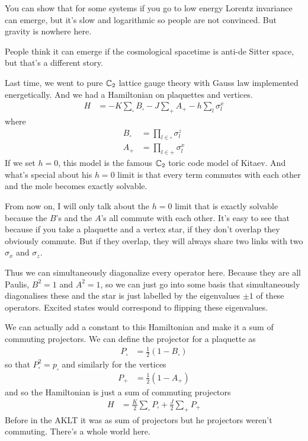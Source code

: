 You can show that for some systems if you go to low energy Lorentz invariance
can emerge,
but it's slow and logarithmic so people are not convinced.
But gravity is nowhere here.

People think it can emerge if the cosmological spacetime is anti-de Sitter
space,
but that's a different story.

Last time,
we went to pure $\mathbb{C}_2$ lattice gauge theory
with Gauss law implemented energetically.
And we had a Hamiltonian on plaquettes and vertices.
\begin{align}
    H &=
    -K \sum_{\square} B_{\square}
    - J \sum_{+} A_{+}
    - h\sum_{l} \sigma_l^{x}
\end{align}
where
\begin{align}
    B_{\square} &=
    \prod_{l \in \square}
    \sigma_l^z\\
    A_{+} &=
    \prod_{l\in +}
    \sigma_l^x
\end{align}
If we set $h=0$,
this model is the famous $\mathbb{C}_2$ toric code model of Kitaev.
And what's special about his $h=0$ limit is that every term commutes with each
other and the mole becomes exactly solvable.

From now on,
I will only talk about the $h=0$ limit that is exactly solvable because
the $B$'s and the $A$'s all commute with each other.
It's easy to see that because if you take a plaquette and a vertex star,
if they don't overlap they obviously commute.
But if they overlap,
they will always share two links with two $\sigma_x$ and $\sigma_z$.

Thus we can simultaneously diagonalize every operator here.
Because they are all Paulis,
$B^2=1$ and $A^2=1$,
so we can just go into  some basis that simultaneously diagonalises these and the
star is just labelled by the eigenvalues $\pm 1$ of these operators.
Excited states would correspond to flipping these eigenvalues.

We can actually add a constant to this Hamiltonian and make it a sum of
commuting projectors.
We can define the projector for a plaquette as
\begin{align}
    P_{\square}
    &=
    \frac{1}{2}\left( 
    1 - B_{\square}
    \right)
\end{align}
so that $P_{\square}^2 = p_{\square}$
and similarly for the vertices
\begin{align}
    P_{+}
    &=
    \frac{1}{2}\left( 1 - A_+ \right)
\end{align}
and so the Hamiltonian is just a sum of commuting projectors
\begin{align}
    H &=
    \frac{K}{2} \sum_{\square} P_{\square}
    +
    \frac{J}{2} \sum_{+} P_{+}
\end{align}
Before in the AKLT it was as sum of projectors but he projectors weren't
commuting.
There's a whole world here.

